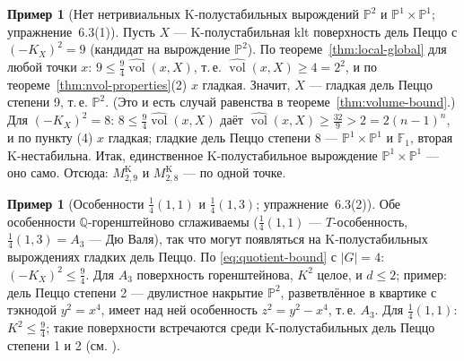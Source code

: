 \documentclass[11pt,a4paper]{article}
\theoremstyle{plain}
\theoremstyle{definition}
\newtheorem{example}[theorem]{Пример}
\theoremstyle{remark}
\newcommand{\Q}{\mathbb{Q}}
\newcommand{\PP}{\mathbb{P}}
\DeclareMathOperator{\vol}{vol}
\newcommand{\hvol}{\widehat{\vol}}
\begin{document}
\begin{example}[Нет нетривиальных K-полустабильных вырождений $\PP^2$ и $\PP^1\times\PP^1$; упражнение~6.3(1)]
Пусть $X$ --- K-полустабильная klt поверхность дель Пеццо с $(-K_X)^2=9$ (кандидат на вырождение
$\PP^2$). По теореме~\ref{thm:local-global} для любой точки $x$: $9\le\frac94\hvol(x,X)$, т.\,е.
$\hvol(x,X)\ge4=2^2$, и по теореме~\ref{thm:nvol-properties}(2) $x$ гладкая. Значит, $X$ --- гладкая
дель Пеццо степени 9, т.\,е. $\PP^2$. (Это и есть случай равенства в теореме~\ref{thm:volume-bound}.)
Для $(-K_X)^2=8$: $8\le\frac94\hvol(x,X)$ даёт $\hvol(x,X)\ge\frac{32}9>2=2(n-1)^n$, и по
пункту (4) $x$ гладкая; гладкие дель Пеццо степени 8 --- $\PP^1\times\PP^1$ и $\mathbb F_1$, вторая
K-нестабильна. Итак, единственное K-полустабильное вырождение $\PP^1\times\PP^1$ --- оно само.
Отсюда: $M^{\mathrm K}_{2,9}$ и $M^{\mathrm K}_{2,8}$ --- по одной точке.
\end{example}

\begin{example}[Особенности $\frac14(1,1)$ и $\frac14(1,3)$; упражнение~6.3(2)]
Обе особенности $\Q$-горенштейново сглаживаемы ($\frac14(1,1)$ --- $T$-особенность,
$\frac14(1,3)=A_3$ --- Дю Валя), так что могут появляться на K-полустабильных вырождениях гладких
дель Пеццо. По \eqref{eq:quotient-bound} с $|G|=4$: $(-K_X)^2\le\frac94$. Для $A_3$ поверхность
горенштейнова, $K^2$ целое, и $d\le2$; пример: дель Пеццо степени 2 --- двулистное накрытие
$\PP^2$, разветвлённое в квартике с тэкнодой $y^2=x^4$, имеет над ней особенность
$z^2=y^2-x^4$, т.\,е. $A_3$. Для $\frac14(1,1)$: $K^2\le\frac94$; такие поверхности встречаются
среди K-полустабильных дель Пеццо степени 1 и 2 (см. \cite{OSS}).
\end{example}
\end{document}
